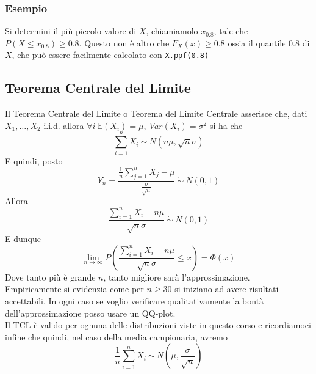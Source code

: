 \documentclass[11pt]{report}
\begin{document}
\subsubsection{Esempio}
Si determini il più piccolo valore di $X$, chiamiamolo $x_{0.8}$, tale che $P(X \leq x_{0.8}) \geq 0.8$. Questo non è altro che $F_X(x) \geq 0.8$ ossia il quantile $0.8$ di $X$, che può essere facilmente calcolato con \texttt{X.ppf(0.8)}
\subsection{Teorema Centrale del Limite}
Il Teorema Centrale del Limite o Teorema del Limite Centrale asserisce che, dati $X_1, \dots, X_2$ i.i.d. allora $\forall i\ \mathbb{E}(X_i) = \mu,\ Var(X_i) = \sigma^2$ si ha che
\begin{equation}
	\sum^n_{i=1} X_i\ \dot\sim\ N \left(n\mu,\sqrt{n}\sigma \right)
\end{equation}
E quindi, posto
\begin{equation}
	Y_n = \frac{\frac{1}{n}\sum^n_{j=1} X_j - \mu}{\frac{\sigma}{\sqrt{n}}}\ \dot\sim\ N(0,1)
\end{equation}
Allora
\begin{equation}
	\frac{\sum^n_{i=1} X_i - n\mu}{\sqrt{n}\sigma}\ \dot\sim\ N(0,1)
\end{equation}
E dunque
\begin{equation}
	\lim_{n \rightarrow \infty} P \left( \frac{\sum^n_{i=1} X_i - n\mu}{\sqrt{n}\sigma} \leq x \right) = \Phi(x)
\end{equation}
Dove tanto più è grande $n$, tanto migliore sarà l'approssimazione.\\
Empiricamente si evidenzia come per $n \geq 30$ si iniziano ad avere risultati accettabili. In ogni caso se voglio verificare qualitativamente la bontà dell'approssimazione posso usare un QQ-plot.\\
Il TCL è valido per ognuna delle distribuzioni viste in questo corso e ricordiamoci infine che quindi, nel caso della media campionaria, avremo
\begin{equation}
	\frac{1}{n} \sum^n_{i=1} X_i\ \dot\sim\ N \left(\mu, \frac{\sigma}{\sqrt{n}} \right)
\end{equation}
\end{document}
